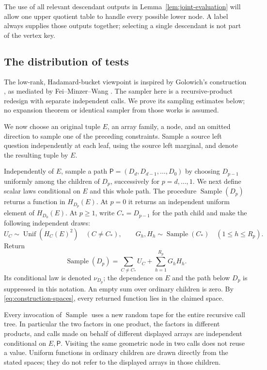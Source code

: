 The use of all relevant descendant outputs in
Lemma~\ref{lem:joint-evaluation} will allow one upper quotient table to
handle every possible lower node.  A label always supplies those
outputs together; selecting a single descendant is not part of the
vertex key.

\subsection{The distribution of tests}

The low-rank, Hadamard-bucket viewpoint is inspired by Golowich's
construction \cite{Golowich2023}, as mediated by Fei--Minzer--Wang
\cite{FeiMinzerWang2026}.  The sampler here is a recursive-product
redesign with separate independent calls.  We prove its sampling
estimates below; no expansion theorem or identical sampler from those
works is assumed.

We now choose an original tuple $E$, an array family, a node, and an omitted
direction to sample one of the preceding constraints.  Sample a source left
question independently at each leaf, using the source left marginal, and
denote the resulting tuple by $E$.

Independently of $E$, sample a path
$\mathsf P=(D_d,D_{d-1},\ldots,D_0)$ by choosing $D_{p-1}$ uniformly
among the children of $D_p$, successively for $p=d,\ldots,1$.
We next define scalar laws conditional on $E$ and this whole path.
The procedure $\operatorname{Sample}(D_p)$ returns a function in $H_{D_p}(E)$.
At $p=0$ it returns an independent uniform element of $H_{D_0}(E)$.
At $p\geq1$, write $C_*=D_{p-1}$ for the path child and make the following
independent draws:
\[
 U_C\sim\operatorname{Unif}(H_C(E)^2)\quad(C\neq C_*),
 \qquad
 G_h,H_h\sim\operatorname{Sample}(C_*)\quad(1\leq h\leq R_p).
\]
Return
\begin{equation}\label{eq:scalar-sampler}
 \operatorname{Sample}(D_p)
   =\sum_{C\neq C_*}U_C+\sum_{h=1}^{R_p}G_hH_h.
\end{equation}
Its conditional law is denoted $\nu_{D_p}$; the dependence on $E$ and
the path below $D_p$ is suppressed in this notation.
An empty sum over ordinary children is zero.  By
\eqref{eq:construction-spaces}, every returned function lies in the
claimed space.

Every invocation of $\operatorname{Sample}$ uses a new random tape for
the entire recursive call tree.  In particular the two factors in one
product, the factors in different products, and calls made on behalf of
different displayed arrays are independent conditional on $E,\mathsf P$.
Visiting the same geometric node in two calls does not reuse a value.
Uniform functions in ordinary children are drawn directly from the stated
spaces; they do not refer to the displayed arrays in those children.

